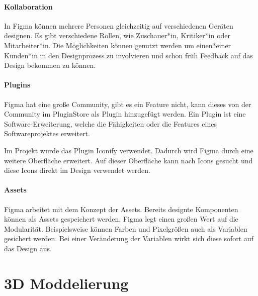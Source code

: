 \paragraph{Kollaboration}
In Figma können mehrere Personen gleichzeitig auf verschiedenen Geräten designen. Es gibt verschiedene Rollen, wie Zuschauer*in, Kritiker*in oder Mitarbeiter*in. Die Möglichkeiten können genutzt werden um einen*einer Kunden*in in den Designprozess zu involvieren und schon früh Feedback auf das Design bekommen zu können.

\paragraph{Plugins}
Figma hat eine große Community, gibt es ein Feature nicht, kann dieses von der Community im PluginStore als Plugin hinzugefügt werden. Ein Plugin ist eine Software-Erweiterung, welche die Fähigkeiten oder die Features eines Softwareprojektes erweitert.

Im Projekt wurde das Plugin Iconify verwendet. Dadurch wird  Figma durch eine weitere Oberfläche erweitert. Auf dieser Oberfläche kann nach Icons gesucht und diese Icons direkt im Design verwendet werden.

\paragraph{Assets}
Figma arbeitet mit dem Konzept der Assets. Bereits designte Komponenten können als Assets gespeichert werden. Figma legt einen großen Wert auf die Modularität. Beispielsweise können Farben und Pixelgrößen auch als Variablen gesichert werden. Bei einer Veränderung der Variablen wirkt sich diese sofort auf das Design aus.

\section{3D Moddelierung}
